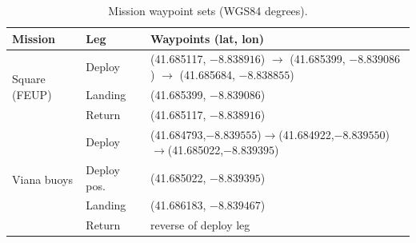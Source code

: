 \begin{table}[H]
\centering
\caption{Mission waypoint sets (WGS84 degrees).}
\label{tab:missions}
\begin{tabular}{@{}lll@{}}
\toprule
Mission & Leg & Waypoints (lat, lon) \\
\midrule
\multirow{3}{*}{Square (FEUP)} & Deploy & (41.685117, $-8.838916$) $\to$ (41.685399, $-8.839086$) $\to$ (41.685684, $-8.838855$)\\
 & Landing & (41.685399, $-8.839086$) \\
 & Return & (41.685117, $-8.838916$) \\
\midrule
\multirow{4}{*}{Viana buoys} & Deploy & (41.684793,$-8.839555$)$\to$(41.684922,$-8.839550$)$\to$(41.685022,$-8.839395$)\\
 & Deploy pos.\ & (41.685022, $-8.839395$)\\
 & Landing & (41.686183, $-8.839467$) \\
 & Return & reverse of deploy leg \\
\bottomrule
\end{tabular}
\end{table}
